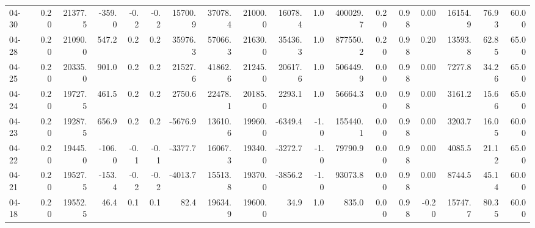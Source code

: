 \begin{threeparttable}
{\begin{tabular}{lrrrrrrrrrrrrrrrrr}
  04-30 &     0.20 & 21377.5 &            -359.0 &              -0.2 &               -0.2 &            15700.9 & 37078.4 & 21000.0 &    16078.4 &                      1.0 &            400029.7 &       0.20 &      0.98 &           0.00 &          16154.9 &           76.93 &                  60.00 \\
  04-28 &     0.20 & 21090.0 &             547.2 &               0.2 &                0.2 &            35976.3 & 57066.3 & 21630.0 &    35436.3 &                      1.0 &            877550.2 &       0.20 &      0.98 &           0.20 &          13593.8 &           62.85 &                  65.00 \\
  04-25 &     0.20 & 20335.0 &             901.0 &               0.2 &                0.2 &            21527.6 & 41862.6 & 21245.0 &    20617.6 &                      1.0 &            506449.9 &       0.00 &      0.98 &           0.00 &           7277.8 &           34.26 &                  65.00 \\
  04-24 &     0.20 & 19727.5 &             461.5 &               0.2 &                0.2 &             2750.6 & 22478.1 & 20185.0 &     2293.1 &                      1.0 &             56664.3 &       0.00 &      0.98 &           0.00 &           3161.2 &           15.66 &                  65.00 \\
  04-23 &     0.20 & 19287.5 &             656.9 &               0.2 &                0.2 &            -5676.9 & 13610.6 & 19960.0 &    -6349.4 &                     -1.0 &            155440.1 &       0.00 &      0.98 &           0.00 &           3203.7 &           16.05 &                  60.00 \\
  04-22 &     0.20 & 19445.0 &            -106.0 &              -0.1 &               -0.1 &            -3377.7 & 16067.3 & 19340.0 &    -3272.7 &                     -1.0 &             79790.9 &       0.00 &      0.98 &           0.00 &           4085.5 &           21.12 &                  65.00 \\
  04-21 &     0.20 & 19527.5 &            -153.4 &              -0.2 &               -0.2 &            -4013.7 & 15513.8 & 19370.0 &    -3856.2 &                     -1.0 &             93073.8 &       0.00 &      0.98 &           0.00 &           8744.5 &           45.14 &                  60.00 \\
  04-18 &     0.20 & 19552.5 &              46.4 &               0.1 &                0.1 &               82.4 & 19634.9 & 19600.0 &       34.9 &                      1.0 &               835.0 &       0.00 &      0.98 &          -0.20 &          15747.7 &           80.35 &                  60.00 \\

\end{tabular}}
\end{threeparttable}
